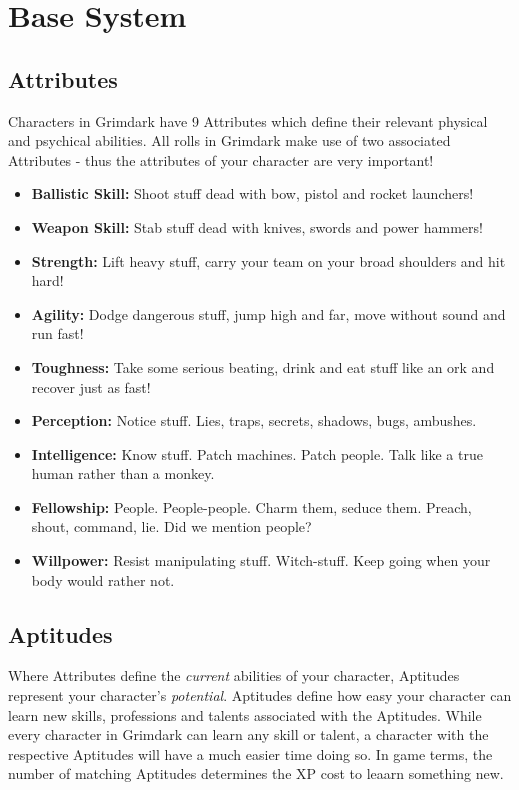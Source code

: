 \chapter{Base System}
\section{Attributes}\label{Attributes}
Characters in Grimdark have 9 Attributes which define their relevant physical and psychical abilities.
All rolls in Grimdark make use of two associated Attributes - thus the attributes of your character are very important!
\begin{itemize}
	\item \textbf{Ballistic Skill:} Shoot stuff dead with bow, pistol and rocket launchers!
	\item \textbf{Weapon Skill:} Stab stuff dead with knives, swords and power hammers!
	\item \textbf{Strength:} Lift heavy stuff, carry your team on your broad shoulders and hit hard!
	\item \textbf{Agility:} Dodge dangerous stuff, jump high and far, move without sound and run fast!
	\item \textbf{Toughness:} Take some serious beating, drink and eat stuff like an ork and recover just as fast!
	\item \textbf{Perception:} Notice stuff. Lies, traps, secrets, shadows, bugs, ambushes.
	\item \textbf{Intelligence:} Know stuff. Patch machines. Patch people. Talk like a true human rather than a monkey.
	\item \textbf{Fellowship:} People. People-people. Charm them, seduce them. Preach, shout, command, lie. Did we mention people?
	\item \textbf{Willpower:} Resist manipulating stuff. Witch-stuff. Keep going when your body would rather not.
\end{itemize}

\section{Aptitudes}\label{Aptitudes}
Where Attributes define the \textit{current} abilities of your character, Aptitudes represent your character's \textit{potential}.
Aptitudes define how easy your character can learn new skills, professions and talents associated with the Aptitudes.
While every character in Grimdark can learn any skill or talent, a character with the respective Aptitudes will have a much easier time doing so.
In game terms, the number of matching Aptitudes determines the XP cost to leaarn something new.

